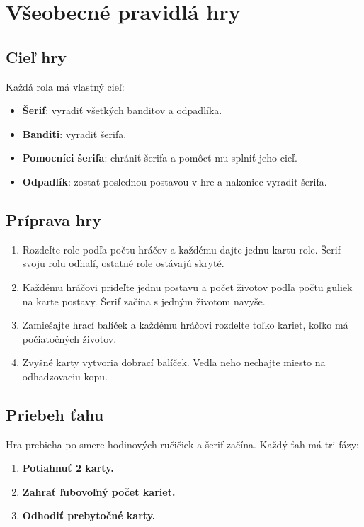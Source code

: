 \chapter{Všeobecné pravidlá hry}

\section*{Cieľ hry}
Každá rola má vlastný cieľ:
\begin{itemize}
    \item \textbf{Šerif}: vyradiť všetkých banditov a odpadlíka.
    \item \textbf{Banditi}: vyradiť šerifa.
    \item \textbf{Pomocníci šerifa}: chrániť šerifa a pomôcť mu splniť jeho cieľ.
    \item \textbf{Odpadlík}: zostať poslednou postavou v hre a nakoniec vyradiť šerifa.
\end{itemize}

\section*{Príprava hry}
\begin{enumerate}
    \item Rozdeľte role podľa počtu hráčov a každému dajte jednu kartu role. Šerif svoju rolu odhalí, ostatné role ostávajú skryté.
    \item Každému hráčovi prideľte jednu postavu a počet životov podľa počtu guliek na karte postavy. Šerif začína s jedným životom navyše.
    \item Zamiešajte hrací balíček a každému hráčovi rozdeľte toľko kariet, koľko má počiatočných životov.
    \item Zvyšné karty vytvoria dobrací balíček. Vedľa neho nechajte miesto na odhadzovaciu kopu.
\end{enumerate}

\section*{Priebeh ťahu}
Hra prebieha po smere hodinových ručičiek a šerif začína. Každý ťah má tri fázy:
\begin{enumerate}
    \item \textbf{Potiahnuť 2 karty.}
    \item \textbf{Zahrať ľubovoľný počet kariet.}
    \item \textbf{Odhodiť prebytočné karty.}
\end{enumerate}

